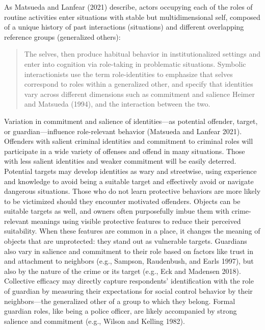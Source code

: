 \documentclass [11pt, proquest] {uwthesis}[2015/03/03]
\begin{document}
As Matsueda and Lanfear (2021) describe, actors occupying each of the roles of routine activities enter situations with stable but multidimensional self, composed of a unique history of past interactions (situations) and different overlapping reference groups (generalized others):
\begin{quote}
The selves, then produce habitual behavior in institutionalized settings and enter into cognition via role-taking in problematic situations. Symbolic interactionists use the term role-identities to emphasize that selves correspond to roles within a generalized other, and specify that identities vary across different dimensions such as commitment and salience Heimer and Matsueda (1994), and the interaction between the two.
\end{quote}
Variation in commitment and salience of identities---as potential offender, target, or guardian---influence role-relevant behavior (Matsueda and Lanfear 2021). Offenders with salient criminal identities and commitment to criminal roles will participate in a wide variety of offenses and offend in many situations. Those with less salient identities and weaker commitment will be easily deterred. Potential targets may develop identities as wary and streetwise, using experience and knowledge to avoid being a suitable target and effectively avoid or navigate dangerous situations. Those who do not learn protective behaviors are more likely to be victimized should they encounter motivated offenders. Objects can be suitable targets as well, and owners often purposefully imbue them with crime-relevant meanings using visible protective features to reduce their perceived suitability. When these features are common in a place, it changes the meaning of objects that are unprotected: they stand out as vulnerable targets. Guardians also vary in salience and commitment to their role based on factors like trust in and attachment to neighbors (e.g., Sampson, Raudenbush, and Earls 1997), but also by the nature of the crime or its target (e.g., Eck and Madensen 2018). Collective efficacy may directly capture respondents' identification with the role of guardian by measuring their expectations for social control behavior by their neighbors---the generalized other of a group to which they belong. Formal guardian roles, like being a police officer, are likely accompanied by strong salience and commitment (e.g., Wilson and Kelling 1982).
\end{document}
